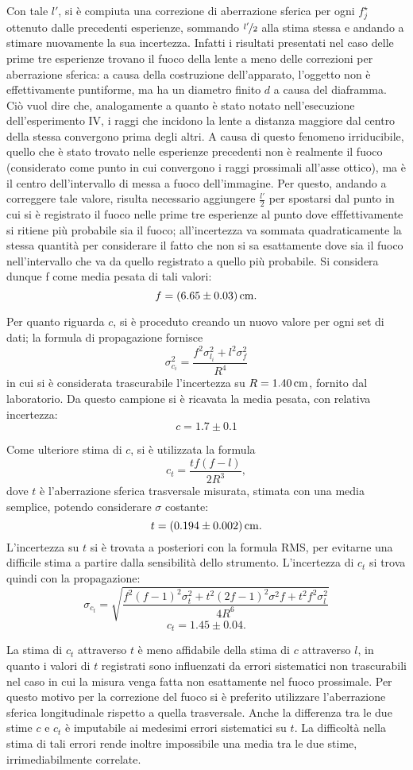 Con tale $l'$, si \`e compiuta una correzione di aberrazione sferica per ogni $f^{\star}_j$ ottenuto dalle precedenti esperienze, sommando $\nicefrac{l'}{2}$ alla stima stessa e andando a stimare nuovamente la sua incertezza. Infatti i risultati presentati nel caso delle prime tre esperienze trovano il fuoco della lente a meno delle correzioni per aberrazione sferica: a causa della costruzione dell'apparato, l'oggetto non è effettivamente puntiforme, ma ha un diametro finito $d$ a causa del diaframma. Ciò vuol dire che, analogamente a quanto è stato notato nell'esecuzione dell'esperimento IV, i raggi che incidono la lente a distanza maggiore dal centro della stessa convergono prima degli altri. A causa di questo fenomeno irriducibile, quello che è stato trovato nelle esperienze precedenti non è realmente il fuoco (considerato come punto in cui convergono i raggi prossimali all'asse ottico), ma è il centro dell'intervallo di messa a fuoco dell'immagine. Per questo, andando a correggere tale valore, risulta necessario aggiungere $\frac{l'}{2}$ per spostarsi dal punto in cui si \`e registrato il fuoco nelle prime tre esperienze al punto dove efffettivamente si ritiene più probabile sia il fuoco; all'incertezza va sommata quadraticamente la stessa quantità per considerare il fatto che non si sa esattamente dove sia il fuoco nell'intervallo che va da quello registrato a quello pi\`u probabile. Si considera dunque f come media pesata di tali valori:
\[ f = (6.65 \pm 0.03) \,\mathrm{cm}. \] 


Per quanto riguarda $c$, si \`e proceduto creando un nuovo valore per ogni set di dati; la formula di propagazione fornisce 
\[  \sigma^2_{c_i} =\frac{f^2    \sigma^2_{l_i} + l^2    \sigma^2_{f}}{R^4} \]
in cui si \`e considerata trascurabile l'incertezza su $R=1.40\,\mathrm{cm}$, fornito dal laboratorio.
Da questo campione si \`e ricavata la media pesata, con relativa incertezza:
\[ c = 1.7 \pm 0.1 \] 



Come ulteriore stima di $c$, si \`e utilizzata la formula
\[ c_t = \frac{t   f   (f-l)}{2R^3}, \]
dove $t$ \`e l'aberrazione sferica trasversale misurata, stimata con una media semplice, potendo considerare $\sigma$ costante:
\[ t = (0.194 \pm 0.002) \,\mathrm{cm}.\]
L'incertezza su $t$ si \`e trovata a posteriori con la formula RMS, per evitarne una difficile stima a partire dalla sensibilit\`a dello strumento. 
L'incertezza di $c_t$ si trova quindi con la propagazione: 
\[ \sigma_{c_t} = \sqrt{ \frac
{ f^2   (f-1)^2    \sigma^2_{t}  +  t^2   (2f-1)^2    \sigma^2{f}  +  t^2   f^2    \sigma^2_{l}}
{4R^6}
}   \]
\[c_t = 1.45 \pm 0.04. \]


La stima di $c_t$ attraverso $t$ \`e meno affidabile della stima di $c$ attraverso $l$, in quanto i valori di $t$ registrati sono influenzati da errori sistematici non trascurabili nel caso in cui la misura venga fatta non esattamente nel fuoco prossimale. Per questo motivo per la correzione del fuoco si \`e preferito utilizzare l'aberrazione sferica longitudinale rispetto a quella trasversale.
Anche la differenza tra le due stime $c$ e $c_t$ \`e imputabile ai medesimi errori sistematici su $t$. La difficolt\`a nella stima di tali errori rende inoltre impossibile una media tra le due stime, irrimediabilmente correlate.
